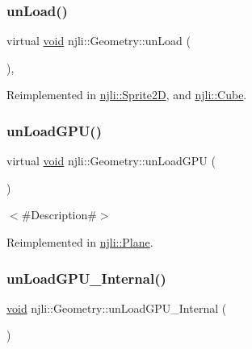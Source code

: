 \subsubsection{\texorpdfstring{un\+Load()}{unLoad()}}
{\footnotesize\ttfamily virtual \mbox{\hyperlink{_thread_8h_af1e856da2e658414cb2456cb6f7ebc66}{void}} njli\+::\+Geometry\+::un\+Load (\begin{DoxyParamCaption}{ }\end{DoxyParamCaption})\hspace{0.3cm}{\ttfamily [protected]}, {\ttfamily [virtual]}}



Reimplemented in \mbox{\hyperlink{classnjli_1_1_sprite2_d_a7d6d0369dd3cd6552d3a188aa323a088}{njli\+::\+Sprite2D}}, and \mbox{\hyperlink{classnjli_1_1_cube_a6699821443ee652912052b4d8ddf58e1}{njli\+::\+Cube}}.

\mbox{\label{classnjli_1_1_geometry_a1c7f801932e981d35c18acd5bf11c8c4}} 
\subsubsection{\texorpdfstring{un\+Load\+G\+P\+U()}{unLoadGPU()}}
{\footnotesize\ttfamily virtual \mbox{\hyperlink{_thread_8h_af1e856da2e658414cb2456cb6f7ebc66}{void}} njli\+::\+Geometry\+::un\+Load\+G\+PU (\begin{DoxyParamCaption}{ }\end{DoxyParamCaption})\hspace{0.3cm}{\ttfamily [virtual]}}

$<$\#\+Description\#$>$ 

Reimplemented in \mbox{\hyperlink{classnjli_1_1_plane_a5a5600ceb6d93991c31bed8249ab0e65}{njli\+::\+Plane}}.

\mbox{\label{classnjli_1_1_geometry_ab4f7836b90acc74a61fce2d49d65a05f}} 
\subsubsection{\texorpdfstring{un\+Load\+G\+P\+U\+\_\+\+Internal()}{unLoadGPU\_Internal()}}
{\footnotesize\ttfamily \mbox{\hyperlink{_thread_8h_af1e856da2e658414cb2456cb6f7ebc66}{void}} njli\+::\+Geometry\+::un\+Load\+G\+P\+U\+\_\+\+Internal (\begin{DoxyParamCaption}{ }\end{DoxyParamCaption})\hspace{0.3cm}{\ttfamily [private]}}



